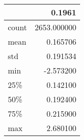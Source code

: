 \begin{tabular}{lr}
\toprule
{} &       0.1961 \\
\midrule
count &  2653.000000 \\
mean  &     0.165706 \\
std   &     0.191534 \\
min   &    -2.573200 \\
25\%   &     0.142100 \\
50\%   &     0.192400 \\
75\%   &     0.215900 \\
max   &     2.680100 \\
\bottomrule
\end{tabular}
